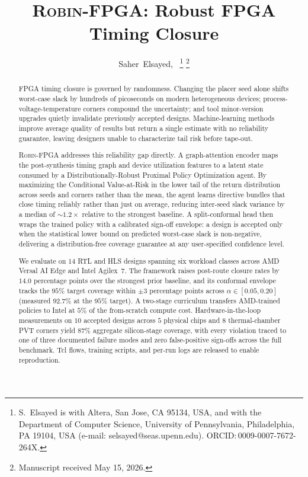 \documentclass[journal]{IEEEtran}
\title{\textsc{Robin-FPGA}: Robust FPGA Timing Closure}
\author{Saher~Elsayed,~\IEEEmembership{Member,~IEEE}%
  \thanks{S.~Elsayed is with Altera, San Jose, CA 95134, USA, and with the Department of Computer Science, University of Pennsylvania, Philadelphia, PA 19104, USA (e-mail: selsayed@seas.upenn.edu). ORCID:\,0009-0007-7672-264X.}%
  \thanks{Manuscript received May 15, 2026.}}
\begin{document}
\maketitle

\begin{abstract}
FPGA timing closure is governed by randomness. Changing the placer seed alone shifts worst-case slack by hundreds of picoseconds on modern heterogeneous devices; process-voltage-temperature corners compound the uncertainty; and tool minor-version upgrades quietly invalidate previously accepted designs. Machine-learning methods improve average quality of results but return a single estimate with no reliability guarantee, leaving designers unable to characterize tail risk before tape-out.

\textsc{Robin-FPGA} addresses this reliability gap directly. A graph-attention encoder maps the post-synthesis timing graph and device utilization features to a latent state consumed by a Distributionally-Robust Proximal Policy Optimization agent. By maximizing the Conditional Value-at-Risk in the lower tail of the return distribution across seeds and corners rather than the mean, the agent learns directive bundles that close timing reliably rather than just on average, reducing inter-seed slack variance by a median of $\sim 1.2\times$ relative to the strongest baseline. A split-conformal head then wraps the trained policy with a calibrated sign-off envelope: a design is accepted only when the statistical lower bound on predicted worst-case slack is non-negative, delivering a distribution-free coverage guarantee at any user-specified confidence level.

We evaluate on $14$ RTL and HLS designs spanning six workload classes across AMD Versal AI Edge and Intel Agilex~7. The framework raises post-route closure rates by $14.0$ percentage points over the strongest prior baseline, and its conformal envelope tracks the $95\%$ target coverage within $\pm 3$ percentage points across $\alpha \in [0.05, 0.20]$ (measured $92.7\%$ at the $95\%$ target). A two-stage curriculum transfers AMD-trained policies to Intel at $5\%$ of the from-scratch compute cost. Hardware-in-the-loop measurements on $10$ accepted designs across $5$ physical chips and $8$ thermal-chamber PVT corners yield $87\%$ aggregate silicon-stage coverage, with every violation traced to one of three documented failure modes and zero false-positive sign-offs across the full benchmark. Tcl flows, training scripts, and per-run logs are released to enable reproduction.
\end{abstract}
\end{document}
